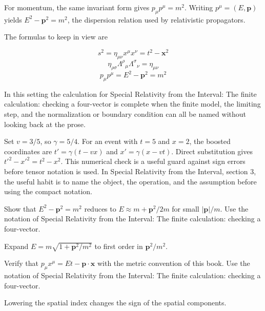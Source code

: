 For momentum, the same invariant form gives \(p_\mu p^\mu=m^2\).  Writing \(p^\mu=(E,\bm p)\) yields \(E^2-\bm p^2=m^2\), the dispersion relation used by relativistic propagators.

The formulas to keep in view are

\[
  s^2=\eta_{\mu\nu}x^\mu x^\nu=t^2-\bm x^2
\]
\[
  \eta_{\rho\sigma}\Lambda^\rho{}_\mu\Lambda^\sigma{}_\nu=\eta_{\mu\nu}
\]
\[
  p_\mu p^\mu=E^2-\bm p^2=m^2
\]

In this setting the calculation for Special Relativity from the Interval: The finite calculation: checking a four-vector is complete when the finite model, the limiting step, and the normalization or boundary condition can all be named without looking back at the prose.




\begin{example}
Set \(v=3/5\), so \(\gamma=5/4\).  For an event with \(t=5\) and \(x=2\), the boosted coordinates are \(t'=\gamma(t-vx)\) and \(x'=\gamma(x-vt)\).  Direct substitution gives \(t'^2-x'^2=t^2-x^2\).  This numerical check is a useful guard against sign errors before tensor notation is used.  In Special Relativity from the Interval, section 3, the useful habit is to name the object, the operation, and the assumption before using the compact notation.
\end{example}



\begin{exercise}
Show that \(E^2-\bm p^2=m^2\) reduces to \(E\approx m+\bm p^2/2m\) for small \(|\bm p|/m\).  Use the notation of Special Relativity from the Interval: The finite calculation: checking a four-vector.
\begin{answer}
Expand \(E=m\sqrt{1+\bm p^2/m^2}\) to first order in \(\bm p^2/m^2\).
\end{answer}
\end{exercise}

\begin{exercise}
Verify that \(p_\mu x^\mu=Et-\bm p\cdot\bm x\) with the metric convention of this book.  Use the notation of Special Relativity from the Interval: The finite calculation: checking a four-vector.
\begin{answer}
Lowering the spatial index changes the sign of the spatial components.
\end{answer}
\end{exercise}



